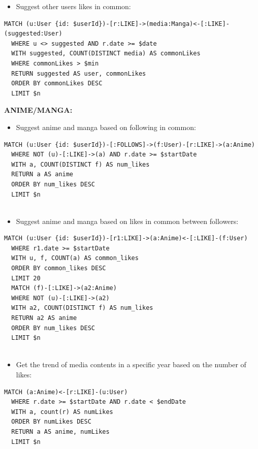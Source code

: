 \begin{itemize}
  \item Suggest other users likes in common:
\end{itemize}
\begin{lstlisting}[language=Cypher, caption=SuggestUsersByCommonLikes]
  MATCH (u:User {id: $userId})-[r:LIKE]->(media:Manga)<-[:LIKE]-(suggested:User) 
  WHERE u <> suggested AND r.date >= $date
  WITH suggested, COUNT(DISTINCT media) AS commonLikes
  WHERE commonLikes > $min
  RETURN suggested AS user, commonLikes
  ORDER BY commonLikes DESC
  LIMIT $n
\end{lstlisting}



\textbf{ANIME/MANGA:}

\begin{itemize}
  \item Suggest anime and manga based on following in common:
\end{itemize}
\begin{lstlisting}[language=Cypher, caption=GetSuggestedByFollowings]
  MATCH (u:User {id: $userId})-[:FOLLOWS]->(f:User)-[r:LIKE]->(a:Anime)
  WHERE NOT (u)-[:LIKE]->(a) AND r.date >= $startDate
  WITH a, COUNT(DISTINCT f) AS num_likes
  RETURN a AS anime
  ORDER BY num_likes DESC
  LIMIT $n
  
\end{lstlisting}


\begin{itemize}
  \item Suggest anime and manga based on likes in common between followers:
\end{itemize}
\begin{lstlisting}[language=Cypher, caption=GetSuggestedByLikes]
  MATCH (u:User {id: $userId})-[r1:LIKE]->(a:Anime)<-[:LIKE]-(f:User)
  WHERE r1.date >= $startDate
  WITH u, f, COUNT(a) AS common_likes
  ORDER BY common_likes DESC
  LIMIT 20
  MATCH (f)-[:LIKE]->(a2:Anime)
  WHERE NOT (u)-[:LIKE]->(a2)
  WITH a2, COUNT(DISTINCT f) AS num_likes
  RETURN a2 AS anime
  ORDER BY num_likes DESC
  LIMIT $n
  
\end{lstlisting}


\begin{itemize}
  \item Get the trend of media contents in a specific year based on the number of likes:
\end{itemize}
\begin{lstlisting}[language=Cypher, caption=GetTrendMediaContentByYear]
  MATCH (a:Anime)<-[r:LIKE]-(u:User)
  WHERE r.date >= $startDate AND r.date < $endDate
  WITH a, count(r) AS numLikes
  ORDER BY numLikes DESC
  RETURN a AS anime, numLikes
  LIMIT $n
  
\end{lstlisting}

